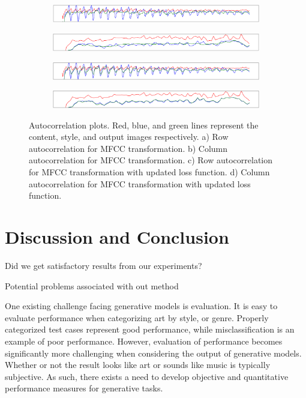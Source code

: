 \documentclass{article}
\begin{document}
\begin{figure}[!h]
\begin{subfigure}{\textwidth}
  \centering
  \includegraphics[width = \textwidth]{row_ac_mfcc_input}
  \caption{}
\end{subfigure}
\begin{subfigure}{\textwidth}
  \centering
  \includegraphics[width = \textwidth]{col_ac_mfcc_input}
  \caption{}
\end{subfigure}
\begin{subfigure}{\textwidth}
  \centering
  \includegraphics[width = \textwidth]{row_ac_input}
  \caption{}
\end{subfigure}
\begin{subfigure}{\textwidth}
  \centering
  \includegraphics[width = \textwidth]{col_ac_input}
  \caption{}
\end{subfigure}
\caption{Autocorrelation plots. Red, blue, and green lines represent the content, style, and output images respectively. a) Row autocorrelation for MFCC transformation. b) Column autocorrelation for MFCC transformation. c) Row autocorrelation for MFCC transformation with updated loss function. d) Column autocorrelation for MFCC transformation with updated loss function.}
\end{figure}

\section{Discussion and Conclusion}

Did we get satisfactory results from our experiments?

Potential problems associated with out method

One existing challenge facing generative models is evaluation. It is easy to evaluate performance when categorizing art by style, or genre. Properly categorized test cases represent good performance, while misclassification is an example of poor performance. However, evaluation of performance becomes significantly more challenging when considering the output of generative models. Whether or not the result looks like art or sounds like music is typically subjective. As such, there exists a need to develop objective and quantitative performance measures for generative tasks.


\end{document}
